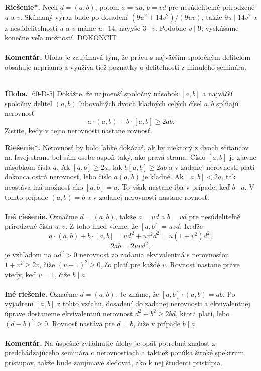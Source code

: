\documentclass[11pt,a4paper,oneside,final]{book}
\newcommand{\kom}{\textbf{Komentár.} }
\newcommand{\ul}{\textbf{Úloha.} }
\newcommand{\rieh}{\textbf{Riešenie*.} }
\begin{document}
\rieh Nech $d = (a, b)$, potom $a = ud$, $b = vd$ pre nesúdeliteľné prirodzené $u$ a $v$. Skúmaný výraz bude po dosadení $(9u^2+ 14v^2)/(9uv)$, takže $9u \mid 14v^2$ a z nesúdeliteľnosti $u$ a $v$ máme $u \mid 14$, navyše $3 \mid v$. Podobne $v \mid 9$; vyskúšame konečne veľa možností. DOKONCIT\\
\\
\kom Úloha je zaujímavá tým, že prácu s najväčším spoločným deliteľom obsahuje nepriamo a využíva tiež poznatky o deliteľnosti z minulého seminára.\\
\\
\begin{tcolorbox}[breakable,notitle,boxrule=0pt,colback=light-gray,colframe=light-gray]\ul [60-D-5]
Dokážte, že najmenší spoločný násobok $[a, b]$ a najväčší spoločný deliteľ $(a, b)$ ľubovoľných dvoch kladných celých čísel $a, b$ spĺňajú nerovnosť
$$a \cdot (a, b) + b \cdot [a, b] \geq 2ab.$$
Zistite, kedy v tejto nerovnosti nastane rovnosť.

\end{tcolorbox}

\rieh Nerovnosť by bolo ľahké dokázať, ak by niektorý z dvoch sčítancov na ľavej strane bol sám osebe aspoň taký, ako pravá strana. Číslo $[a, b]$ je zjavne násobkom čísla $a$. Ak $[a, b] \geq 2a$, tak $b[a, b] \geq 2ab$ a v zadanej nerovnosti platí dokonca ostrá nerovnosť, lebo číslo $a(a, b)$ je kladné. Ak $[a, b] < 2a$, tak neostáva iná možnosť ako $[a, b] = a$. To však nastane iba v prípade, keď $b \mid a$. V tomto prípade $(a, b) = b$ a v zadanej nerovnosti
nastane rovnosť.\\
\\
\textbf{Iné riešenie.} Označme $d = (a, b)$, takže $a = ud$ a $b = vd$ pre nesúdeliteľné prirodzené čísla $u, v$. Z toho hneď vieme, že $[a, b] = uvd$. Keďže
$$a \cdot (a, b) + b \cdot [a, b] = ud^2+ uv^2d^2= u(1 + v^2
)d^2,$$
$$2ab = 2uvd^2,$$
je vzhľadom na $ud^2 > 0$ nerovnosť zo zadania ekvivalentná s nerovnosťou $1 + v^2 \geq 2v$, čiže $(v - 1)^2 \geq0$, čo platí pre každé $v$. Rovnosť nastane práve vtedy, keď $v = 1$, čiže $b \mid a$.\\
\\
\textbf{Iné riešenie.} Označme $d = (a, b)$. Je známe, že $[a, b] \cdot (a, b) = ab$. Po vyjadrení $[a, b]$ z tohto vzťahu, dosadení do zadanej nerovnosti a ekvivalentnej úprave dostaneme ekvivalentnú nerovnosť $d^2 + b^2 \geq 2bd$, ktorá platí, lebo $(d - b)^2 \geq 0$. Rovnosť nastáva
pre $d = b$, čiže v prípade $b \mid a$.\\
\\
\kom Na úspešné zvládnutie úlohy je opäť potrebná znalosť z predchádzajúceho seminára o nerovnostiach a taktiež ponúka široké spektrum prístupov, takže bude zaujímavé sledovať, ako k nej študenti pristúpia.
\end{document}
